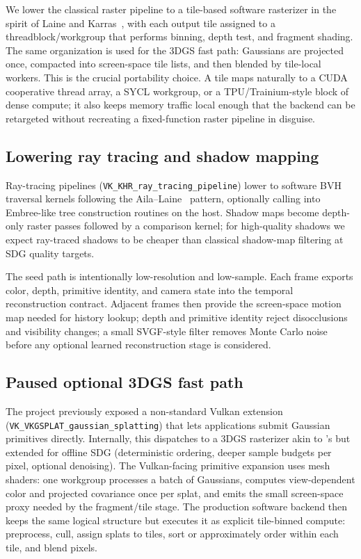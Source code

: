 \documentclass[10pt,journal]{IEEEtran}
\begin{document}
We lower the classical raster pipeline to a tile-based software
rasterizer in the spirit of Laine and
Karras~\cite{laine2011software}, with each output tile assigned to a
threadblock\slash workgroup that performs binning, depth test, and
fragment shading. The same organization is used for the 3DGS fast path:
Gaussians are projected once, compacted into screen-space tile lists,
and then blended by tile-local workers. This is the crucial portability
choice. A tile maps naturally to a CUDA cooperative thread array, a SYCL
workgroup, or a TPU/Trainium-style block of dense compute; it also keeps
memory traffic local enough that the backend can be retargeted without
recreating a fixed-function raster pipeline in disguise.

\subsection{Lowering ray tracing and shadow mapping}

Ray-tracing pipelines (\texttt{VK\_KHR\_ray\_tracing\_pipeline}) lower to
software BVH traversal kernels following the
Aila--Laine~\cite{aila2009understanding} pattern, optionally calling
into Embree-like tree construction routines on the host. Shadow maps
become depth-only raster passes followed by a comparison kernel; for
high-quality shadows we expect ray-traced shadows to be cheaper than
classical shadow-map filtering at SDG quality targets.

The seed path is intentionally low-resolution and low-sample. Each
frame exports color, depth, primitive identity, and camera state into
the temporal reconstruction contract. Adjacent frames then provide the
screen-space motion map needed for history lookup; depth and primitive
identity reject disocclusions and visibility changes; a small
SVGF-style filter removes Monte Carlo noise before any optional learned
reconstruction stage is considered.

\subsection{Paused optional 3DGS fast path}\label{sec:v1}

The project previously exposed a non-standard Vulkan extension
(\texttt{VK\_VKGSPLAT\_gaussian\_splatting}) that lets applications submit
Gaussian primitives directly. Internally, this dispatches to a
3DGS rasterizer akin to \cite{kerbl20233dgs}'s but extended for offline
SDG (deterministic ordering, deeper sample budgets per pixel, optional
denoising). The Vulkan-facing primitive expansion uses mesh shaders:
one workgroup processes a batch of Gaussians, computes view-dependent
color and projected covariance once per splat, and emits the small
screen-space proxy needed by the fragment/tile stage. The production
software backend then keeps the same logical structure but executes it
as explicit tile-binned compute: preprocess, cull, assign splats to
tiles, sort or approximately order within each tile, and blend pixels.
\end{document}
